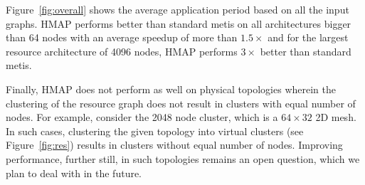 Figure~\ref{fig:overall} shows the average application period based
on all the input graphs. HMAP performs better than standard metis on all
architectures bigger than 64 nodes with an average speedup of more than
$1.5\times$ and for the largest resource architecture of 4096 nodes, HMAP
performs $3\times$ better than standard metis.

Finally, HMAP does not perform as well on physical topologies wherein
the clustering of the resource graph does not result in clusters with
equal number of nodes. For example, consider the 2048 node cluster,
which is a $64\times32$ 2D mesh. In such cases, clustering the given
topology into virtual clusters (see Figure~\ref{fig:res}) results in
clusters without equal number of nodes. Improving performance, further
still, in such topologies remains an open question, which we plan to
deal with in the future.






